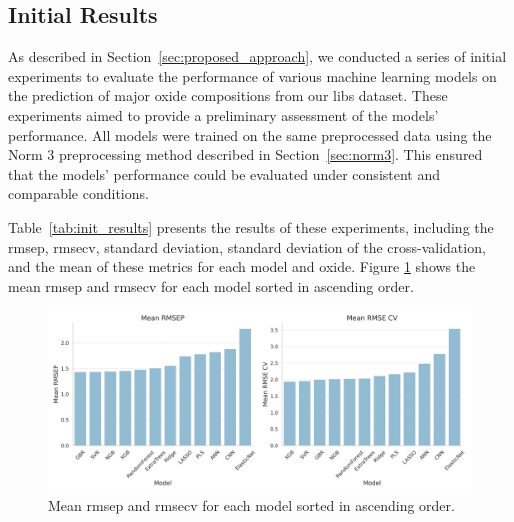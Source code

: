 \subsection{Initial Results}
As described in Section~\ref{sec:proposed_approach}, we conducted a series of initial experiments to evaluate the performance of various machine learning models on the prediction of major oxide compositions from our \gls{libs} dataset.
These experiments aimed to provide a preliminary assessment of the models' performance.
All models were trained on the same preprocessed data using the Norm 3 preprocessing method described in Section~\ref{sec:norm3}.
This ensured that the models' performance could be evaluated under consistent and comparable conditions.

Table~\ref{tab:init_results} presents the results of these experiments, including the \gls{rmsep}, \gls{rmsecv}, standard deviation, standard deviation of the cross-validation, and the mean of these metrics for each model and oxide.
Figure \ref{fig:init_results_rmses} shows the mean \gls{rmsep} and \gls{rmsecv} for each model sorted in ascending order.

\begin{figure}[h]
    \centering
    \includegraphics[width=\textwidth]{images/init_results_rmses.png}
    \caption{Mean \gls{rmsep} and \gls{rmsecv} for each model sorted in ascending order.}
    \label{fig:init_results_rmses}
\end{figure}

